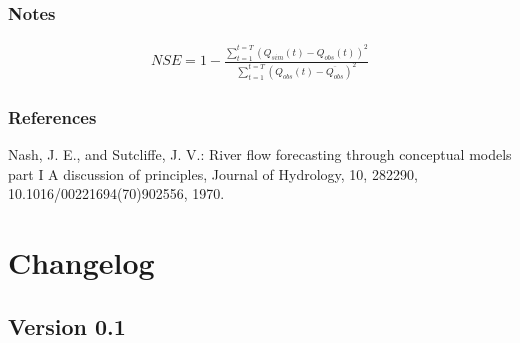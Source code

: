 \documentclass[letterpaper,10pt,english]{sphinxmanual}
\begin{document}
\begin{fulllineitems}
\begin{sphinxVerbatim}[commandchars=\\\{\}]
   
   
  \PYG{p}{[}     \PYG{p}{]}
  \PYG{p}{[}     \PYG{p}{]}
 
\end{sphinxVerbatim}
\subsubsection*{Notes}
\begin{equation*}
\begin{split}NSE = 1 - \frac{\sum_{t=1}^{t=T} (Q_{sim}(t) - Q_{obs}(t))^2}{\sum_{t=1}^{t=T} (Q_{obs}(t) - \overline{Q_{obs}})^2}\end{split}
\end{equation*}\subsubsection*{References}

Nash, J. E., and Sutcliffe, J. V.: River flow forecasting through
conceptual models part I \sphinxhyphen{} A discussion of principles, Journal of
Hydrology, 10, 282\sphinxhyphen{}290, 10.1016/0022\sphinxhyphen{}1694(70)90255\sphinxhyphen{}6, 1970.

\end{fulllineitems}



\section{Changelog}
\label{\detokenize{changelog:changelog}}\label{\detokenize{changelog::doc}}

\subsection{Version 0.1}
\label{\detokenize{changelog:version-0-1}}


\renewcommand{\indexname}{Index}
\printindex
\end{document}
